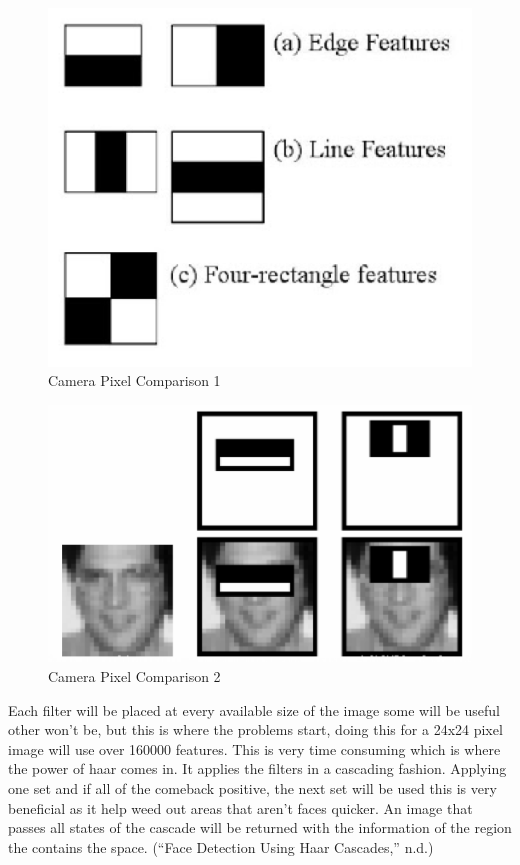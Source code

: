 \documentclass[
  english,
  a4paper,
,tablecaptionabove
]{scrartcl}
\begin{document}
\begin{figure}
\centering
\includegraphics{images/ppm-images/camera-algorithm1.png}
\caption{Camera Pixel Comparison 1}
\end{figure}

\begin{figure}
\centering
\includegraphics{images/ppm-images/camera-algorithm2.png}
\caption{Camera Pixel Comparison 2}
\end{figure}

Each filter will be placed at every available size of the image some
will be useful other won't be, but this is where the problems start,
doing this for a 24x24 pixel image will use over 160000 features. This
is very time consuming which is where the power of haar comes in. It
applies the filters in a cascading fashion. Applying one set and if all
of the comeback positive, the next set will be used this is very
beneficial as it help weed out areas that aren't faces quicker. An image
that passes all states of the cascade will be returned with the
information of the region the contains the space. (``Face Detection
Using Haar Cascades,'' n.d.)
\end{document}
